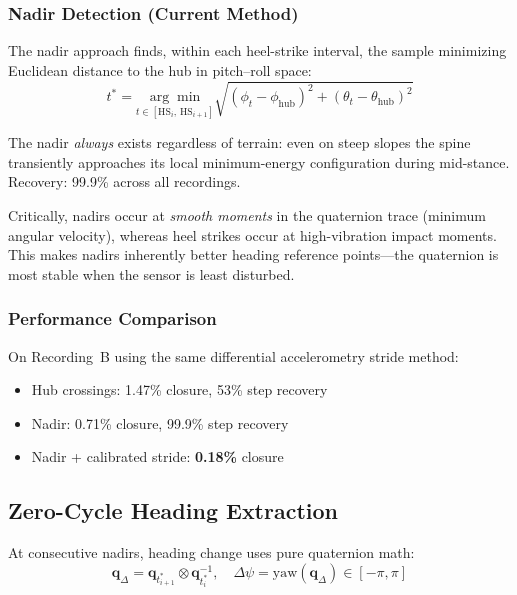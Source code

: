 \documentclass[11pt,a4paper]{article}
\begin{document}
\subsubsection{Nadir Detection (Current Method)}

The nadir approach finds, within each heel-strike interval, the sample
minimizing Euclidean distance to the hub in pitch--roll space:
\begin{equation}
t^* = \underset{t \in [\text{HS}_i,\, \text{HS}_{i+1}]}{\arg\min}
\sqrt{(\phi_t - \phi_\text{hub})^2 + (\theta_t - \theta_\text{hub})^2}
\end{equation}

The nadir \textit{always} exists regardless of terrain: even on steep slopes
the spine transiently approaches its local minimum-energy configuration during
mid-stance. Recovery: 99.9\% across all recordings.

Critically, nadirs occur at \textit{smooth moments} in the quaternion trace
(minimum angular velocity), whereas heel strikes occur at high-vibration
impact moments. This makes nadirs inherently better heading reference
points---the quaternion is most stable when the sensor is least disturbed.

\subsubsection{Performance Comparison}

On Recording~B using the same differential accelerometry stride method:
\begin{itemize}[nosep]
\item Hub crossings: 1.47\% closure, 53\% step recovery
\item Nadir: 0.71\% closure, 99.9\% step recovery
\item Nadir + calibrated stride: \textbf{0.18\%} closure
\end{itemize}

\subsection{Zero-Cycle Heading Extraction}

At consecutive nadirs, heading change uses pure quaternion math:
\begin{equation}
\mathbf{q}_\Delta = \mathbf{q}_{t^*_{i+1}} \otimes \mathbf{q}_{t^*_i}^{-1},
\quad \Delta\psi = \text{yaw}(\mathbf{q}_\Delta) \in [-\pi, \pi]
\end{equation}
\end{document}
